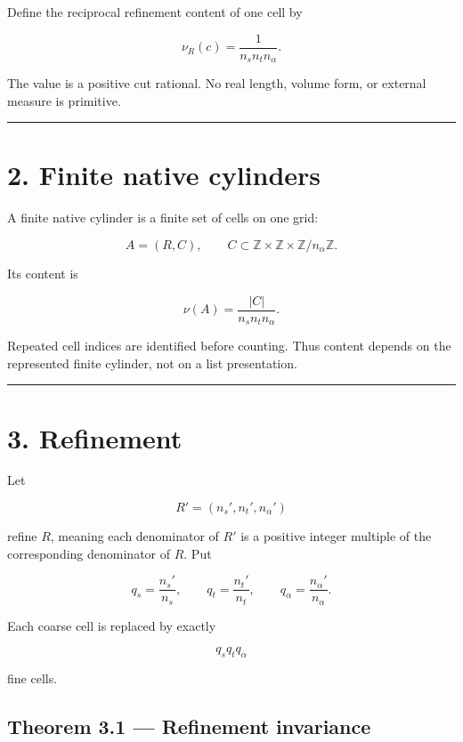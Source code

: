 Define the reciprocal refinement content of one cell by

\[
\boxed{
\nu_R(c)=\frac{1}{n_sn_tn_\alpha}.
}
\tag{1.3}
\]

The value is a positive cut rational. No real length, volume form, or external
measure is primitive.

\begin{center}\rule{0.5\linewidth}{0.5pt}\end{center}

\hypertarget{finite-native-cylinders}{%
\section{2. Finite native cylinders}\label{finite-native-cylinders}}

A finite native cylinder is a finite set of cells on one grid:

\[
A=(R,C),
\qquad
C\subset
\mathbb Z\times\mathbb Z\times
\mathbb Z/n_\alpha\mathbb Z.
\tag{2.1}
\]

Its content is

\[
\boxed{
\nu(A)=\frac{|C|}{n_sn_tn_\alpha}.
}
\tag{2.2}
\]

Repeated cell indices are identified before counting. Thus content depends on
the represented finite cylinder, not on a list presentation.

\begin{center}\rule{0.5\linewidth}{0.5pt}\end{center}

\hypertarget{refinement}{%
\section{3. Refinement}\label{refinement}}

Let

\[
R'=(n_s',n_t',n_\alpha')
\]

refine \(R\), meaning each denominator of \(R'\) is a positive integer multiple
of the corresponding denominator of \(R\). Put

\[
q_s=\frac{n_s'}{n_s},
\qquad
q_t=\frac{n_t'}{n_t},
\qquad
q_\alpha=\frac{n_\alpha'}{n_\alpha}.
\tag{3.1}
\]

Each coarse cell is replaced by exactly

\[
q_sq_tq_\alpha
\tag{3.2}
\]

fine cells.

\hypertarget{theorem-3.1-refinement-invariance}{%
\subsection{Theorem 3.1 --- Refinement invariance}\label{theorem-3.1-refinement-invariance}}

